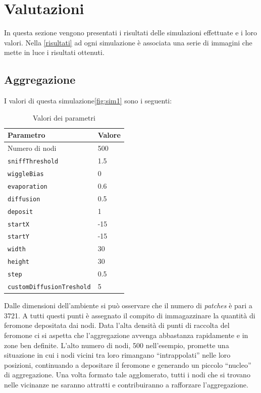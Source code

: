 \chapter{Valutazioni}
In questa sezione vengono presentati i risultati delle simulazioni effettuate e i loro valori.
Nella \cref{risultati} ad ogni simulazione è associata una serie di immagini che mette in luce i risultati ottenuti.
\section{Aggregazione}\label{sim1}
I valori di questa simulazione\space \cref{fig:sim1} sono i seguenti:
\begin{table}[ht]
    \centering
    \caption{Valori dei parametri}
    \begin{tabular}{ll}
        \toprule
        Parametro                   & Valore \\
        \midrule
        Numero di nodi              & 500    \\
        \texttt{sniffThreshold}     & 1.5    \\
        \texttt{wiggleBias}         & 0      \\
        \texttt{evaporation}        & 0.6    \\
        \texttt{diffusion}          & 0.5    \\
        \texttt{deposit}            & 1      \\
        \texttt{startX}             & -15    \\
        \texttt{startY}             & -15    \\
        \texttt{width}              & 30     \\
        \texttt{height}             & 30     \\
        \texttt{step}               & 0.5    \\
        \texttt{customDiffusionTreshold} & 5 \\
        \bottomrule
    \end{tabular}\label{tab:parametri1}
\end{table}\newline
Dalle dimensioni dell'ambiente si può osservare che il numero di \textit{patches} è pari a 3721. A tutti questi punti è assegnato il compito di 
immagazzinare la quantità di feromone depositata dai nodi. 
Data l'alta densità di punti di raccolta del feromone ci si aspetta che l'aggregazione avvenga abbastanza rapidamente e in zone ben definite. 
L'alto numero di nodi, 500 nell'esempio, promette una situazione in cui i nodi vicini tra loro rimangano ``intrappolati'' nelle loro posizioni, continuando a depositare il feromone e 
generando un piccolo ``nucleo'' di aggregazione. Una volta formato tale agglomerato, tutti i nodi che si trovano nelle vicinanze ne saranno attratti
e contribuiranno a rafforzare l'aggregazione.


